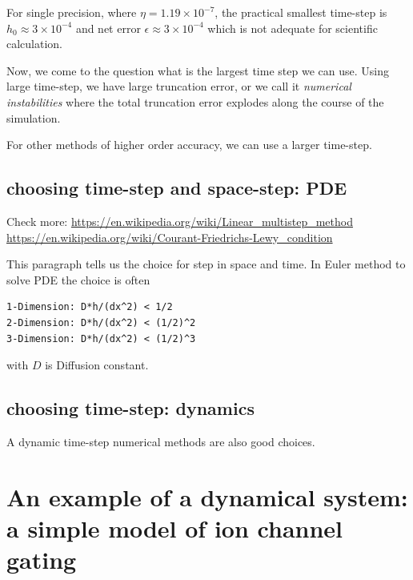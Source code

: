 \begin{framed}
For single precision, where $\eta = 1.19\times 10^{-7}$, the practical
smallest time-step is $h_0\approx 3\times 10^{-4}$ and net error $\epsilon
\approx 3\times 10^{-4}$ which is not adequate for scientific calculation. 
\end{framed}

Now, we come to the question what is the largest time step we can use.
Using large time-step, we have large truncation error, or we call it {\it
numerical instabilities} where the total truncation error explodes along the
course of the simulation.

For other methods of higher order accuracy, we can use a larger time-step. 

\subsection{choosing time-step and space-step: PDE}


Check more: 
\url{https://en.wikipedia.org/wiki/Linear_multistep_method}
\url{https://en.wikipedia.org/wiki/Courant-Friedrichs-Lewy_condition}

This paragraph tells us the choice for step in space and time. In Euler method
to solve PDE the choice is often
\begin{verbatim}
1-Dimension: D*h/(dx^2) < 1/2
2-Dimension: D*h/(dx^2) < (1/2)^2
3-Dimension: D*h/(dx^2) < (1/2)^3
\end{verbatim}
with $D$ is Diffusion constant. 

\subsection{choosing time-step: dynamics}

A dynamic time-step numerical methods are also good
choices. 



\section{An example of a dynamical system: a simple model of ion channel gating}
\label{sec:model-ion-channel}


